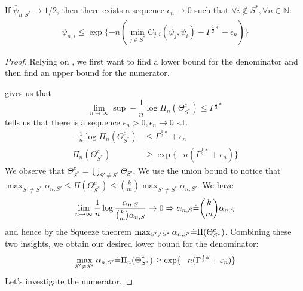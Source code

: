 \textbf{}
If $\bar{\psi}_{n, S^*} \rightarrow 1/2$, then there exists a sequence
$\epsilon_n \rightarrow 0$ such that $\forall i \notin S^*, \forall n \in
\mathbb{N}$:
\begin{align}
  \psi_{n, i} \leq \exp\{-n( \min_{j \in S^*} C_{j, i}(\bar{\psi}_j,
      \bar{\psi}_i) - \Gamma^{\frac{1}{2}*} - \epsilon_n) \}
\end{align}
\begin{proof}
  Relying on , we first want to find a
  lower bound for the denominator and then find an upper bound for the
  numerator.

   gives us that
  \[\lim_{n \rightarrow \infty} \sup - \frac{1}{n} \log \Pi_n(\Theta^c_{S^*})
      \leq \Gamma^{\frac{1}{2}*}\]
   tells us that there is a sequence $\epsilon_n > 0,
  \epsilon_n \rightarrow 0$ s.t.
  \begin{align}
    - \frac{1}{n} \log \Pi_n(\Theta^c_{S^*}) &\leq \Gamma^{\frac{1}{2}*} +
        \epsilon_n \label{eq: epsilon}\\
   \Pi_n(\Theta^c_{S^*}) &\geq \exp\{-n (\Gamma^{\frac{1}{2}*} + \epsilon_n)\}
  \end{align}
  We observe that $\Theta^c_{S^*} = \bigcup_{S' \neq S^*} \Theta_{S'}$. We use
  the union bound to notice that $ \max_{S' \neq S^*} \alpha_{n, S'} \leq
  \Pi(\Theta_{S^*}^c) \leq {k \choose m} \max_{S' \neq S^*} \alpha_{n, S'}$. We
  have \[\lim_{n \rightarrow \infty} \frac{1}{n} \log\frac{\alpha_{n, S}}{{k
  \choose m} \alpha_{n, S}} \rightarrow 0 \Rightarrow \alpha_{n, S} \dot{=} {k
  \choose m} \alpha_{n, S}\] and hence by the Squeeze theorem $\max_{S' \neq
  S^*} \alpha_{n, S'} \dot{=} \Pi(\Theta_{S^*}^c)$. Combining these two insights,
  we obtain our desired lower bound for the denominator:
  \[\max_{S' \neq S^*} \alpha_{n, S'} \dot{=} \Pi_n(\Theta^c_{S^*}) \geq \exp\{-n
      (\Gamma^{\frac{1}{2}*} + \varepsilon_n)\}\]
  Let's investigate the numerator.


\end{proof}
